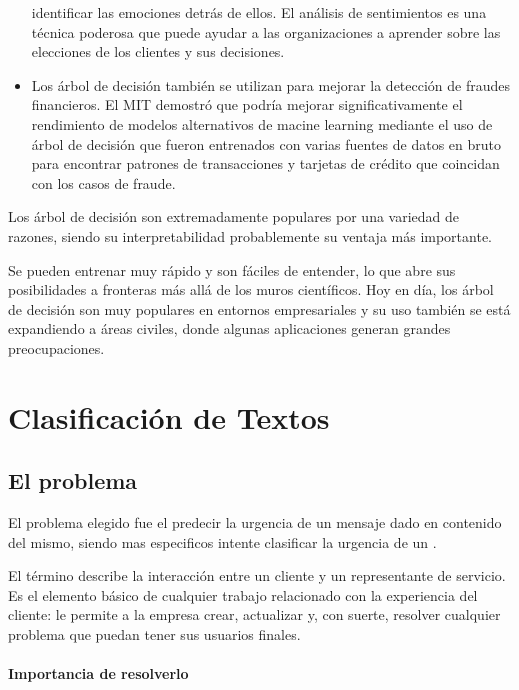 \documentclass[12pt, fleqn]{report}                             %
\newcommand \Quote              {\qq}                           %
\theoremstyle{break}                                            %
\begin{document}
\begin{itemize}
            identificar las emociones detrás de ellos. El análisis de sentimientos es una 
            técnica poderosa que puede ayudar a las organizaciones a aprender sobre las elecciones de los clientes y 
            sus decisiones.
            \item Los árbol de decisión también se utilizan para mejorar la detección de fraudes financieros. 
            El MIT demostró que podría mejorar significativamente el rendimiento de
            modelos alternativos de macine learning mediante el uso de árbol de decisión que fueron entrenados con 
            varias fuentes de datos en bruto para encontrar patrones de transacciones y tarjetas de crédito que 
            coincidan con los casos de fraude.
        \end{itemize}

        Los árbol de decisión son extremadamente populares por una variedad de razones, siendo su 
        interpretabilidad probablemente su ventaja más importante. 
        
        Se pueden entrenar muy rápido y son fáciles de entender, lo que abre sus posibilidades a fronteras más allá 
        de los muros científicos. 
        Hoy en día, los árbol de decisión son muy populares en entornos empresariales y su uso también se está 
        expandiendo a áreas civiles, donde algunas aplicaciones generan grandes preocupaciones. \cite{2}

\part{Clasificación de Textos}

    \chapter{El problema}

        El problema elegido fue el predecir la urgencia de un mensaje dado en contenido del mismo, siendo mas especificos
        intente clasificar la urgencia de un \Quote{support ticket}.

        El término describe la interacción entre un cliente y un representante de servicio. 
        Es el elemento básico de cualquier trabajo relacionado con la experiencia del cliente: 
        le permite a la empresa crear, actualizar y, con suerte, resolver cualquier problema que 
        puedan tener sus usuarios finales.

        \subsection{Importancia de resolverlo}
\end{document}
